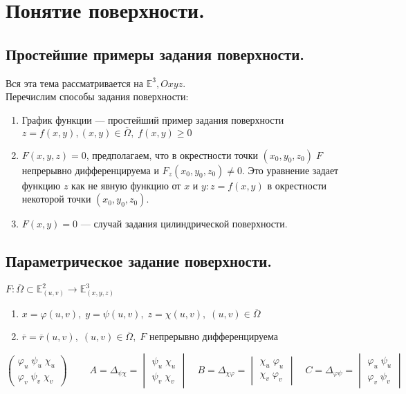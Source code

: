 \section{Понятие поверхности.}
\subsection{Простейшие примеры задания поверхности.}
Вся эта тема рассматривается на $ \mathbb{E}^3, Oxyz $.\\
Перечислим способы задания поверхности:
\begin{enumerate}[$ 1^\circ $]
	\item График функции --- простейший пример задания поверхности\\
	$ z=f(x,y), (x,y)\in\overline{\Omega},\;f(x,y)\geqslant0 $
	\item $ F(x,y,z)=0 $, предполагаем, что в окрестности точки $ (x_{0},y_{0},z_{0})\;F$ непрерывно дифференцируема и $F_{z}(x_0,y_0,z_0)\neq0$. Это уравнение задает функцию $ z $ как не явную функцию от $ x $ и $ y:z=f(x,y) $ в окрестности некоторой точки $ (x_{0},y_{0},z_{0}) $. 
	\item $ F(x,y)=0 $ --- случай задания цилиндрической поверхности. 
\end{enumerate}
\subsection{Параметрическое задание поверхности.} 
$ F:\overline{\Omega} \subset \mathbb{E}^2_{(u,v)} \rightarrow \mathbb{E}^3_{(x,y,z)}$
\begin{enumerate}[I]
	\item $ x = \varphi(u,v),\; y = \psi(u,v),\; z = \chi(u,v),\; (u,v)\in\overline{\Omega}$ %
	\item $ \overline{r}=\overline{r}(u,v),\; (u,v)\in\overline{\Omega},\;F $ непрерывно дифференцируема
	  \end{enumerate}
	$
	\begin{pmatrix}
		\varphi_u\;\psi_u\;\chi_u\\
		\varphi_v\;\psi_v\;\chi_v
	\end{pmatrix}\qquad
	\; A = \Delta_{\psi \chi} = \begin{vmatrix}
	\psi_u\;\chi_u\\ \psi_v\; \chi_v
	\end{vmatrix}\quad
	B=\Delta_{\chi \varphi}= \begin{vmatrix}
	\chi_u\;\varphi_u\\\chi_v\;\varphi_v
	\end{vmatrix}\quad
	C=\Delta_{\varphi \psi} = \begin{vmatrix}
	\varphi_u\;\psi_u\\\varphi_v\;\psi_v
	\end{vmatrix}
	$\\
	
